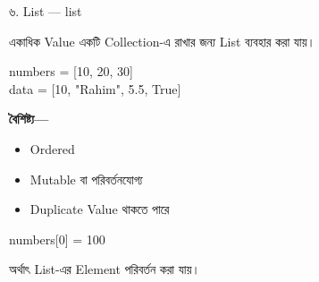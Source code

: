 

\noindent
\begin{minipage}[t]{0.49\linewidth}

\begin{examplebox}{৬. List — \textenglish{\ttfamily list}}

একাধিক Value একটি Collection-এ রাখার জন্য List ব্যবহার করা যায়।

\begin{codebox}
\begin{english}
\ttfamily
numbers = [10, 20, 30]\\
data = [10, "Rahim", 5.5, True]
\end{english}
\end{codebox}

\textbf{বৈশিষ্ট্য—}

\begin{itemize}
\item Ordered
\item Mutable বা পরিবর্তনযোগ্য
\item Duplicate Value থাকতে পারে
\end{itemize}

\begin{codebox}
\begin{english}
\ttfamily
numbers[0] = 100
\end{english}
\end{codebox}

অর্থাৎ List-এর Element পরিবর্তন করা যায়।

\end{examplebox}

\end{minipage}
\hfill
